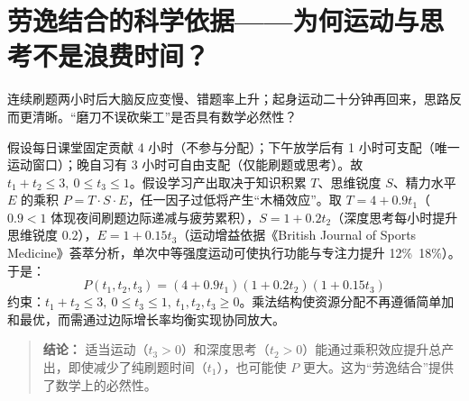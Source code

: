 \documentclass[10pt]{article}
\begin{document}
\section{劳逸结合的科学依据——为何运动与思考不是浪费时间？}

连续刷题两小时后大脑反应变慢、错题率上升；起身运动二十分钟再回来，思路反而更清晰。“磨刀不误砍柴工”是否具有数学必然性？

假设每日课堂固定贡献 4 小时（不参与分配）；下午放学后有 1 小时可支配（唯一运动窗口）；晚自习有 3 小时可自由支配（仅能刷题或思考）。故 $t_1+t_2\le 3,\ 0\le t_3\le 1$。假设学习产出取决于知识积累 $T$、思维锐度 $S$、精力水平 $E$ 的乘积 $P=T\cdot S\cdot E$，任一因子过低将产生“木桶效应”。取 $T=4+0.9t_1$（$0.9<1$ 体现夜间刷题边际递减与疲劳累积），$S=1+0.2t_2$（深度思考每小时提升思维锐度 $0.2$），$E=1+0.15t_3$（运动增益依据《British Journal of Sports Medicine》荟萃分析，单次中等强度运动可使执行功能与专注力提升 12\%~18\%）。于是：
$$
P(t_1,t_2,t_3) = (4+0.9t_1)(1+0.2t_2)(1+0.15t_3)
$$
约束：$t_1+t_2\le 3,\ 0\le t_3\le 1,\ t_1,t_2,t_3\ge 0$。乘法结构使资源分配不再遵循简单加和最优，而需通过边际增长率均衡实现协同放大。

\begin{quote}
\textbf{结论：} 适当运动（$t_3>0$）和深度思考（$t_2>0$）能通过乘积效应提升总产出，即使减少了纯刷题时间（$t_1$），也可能使 $P$ 更大。这为“劳逸结合”提供了数学上的必然性。
\end{quote}
\end{document}
